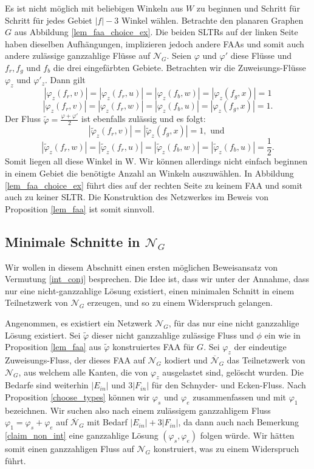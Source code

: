 \begin{example}
Es ist nicht möglich mit beliebigen Winkeln aus $W$ zu beginnen und Schritt für Schritt für jedes Gebiet $|f|-3$ Winkel wählen. Betrachte den planaren Graphen $G$ aus Abbildung \ref{lem_faa_choice_ex}. Die beiden SLTRs auf der linken Seite haben dieselben Aufhängungen, implizieren jedoch andere FAAs und somit auch andere zulässige ganzzahlige Flüsse auf $\mathcal{N}_G$. Seien $\varphi$ und $\varphi'$ diese Flüsse und $f_{r},f_{g}$ und $f_b$ die drei eingefärbten Gebiete. Betrachten wir die Zuweisungs-Flüsse $\varphi_z$ und $\varphi'_z$. Dann gilt $$|\varphi_z(f_r,v)|=|\varphi_z(f_r,u)|=|\varphi_z(f_b,w)| = |\varphi_z(f_g,x)| = 1$$
$$|\varphi_z(f_r,v)|=|\varphi_z(f_r,w)|=|\varphi_z(f_b,u)| = |\varphi_z(f_g,x)| = 1.$$
Der Fluss $\tilde{\varphi}=\frac{\varphi+\varphi'}{2}$ ist ebenfalls zulässig und es folgt:
$$|\tilde{\varphi}_z(f_r,v)|=|\tilde{\varphi}_z(f_g,x)| = 1, \text{ und } $$
$$|\tilde{\varphi}_z(f_r,w)|=|\tilde{\varphi}_z(f_r,u)| = |\tilde{\varphi}_z(f_b,w)|=|\tilde{\varphi}_z(f_b,u)| = \frac{1}{2}.$$
Somit liegen all diese Winkel in W. Wir können allerdings nicht einfach beginnen in einem Gebiet die benötigte Anzahl an Winkeln auszuwählen. In Abbildung \ref{lem_faa_choice_ex} führt dies auf der rechten Seite zu keinem FAA und somit auch zu keiner SLTR. Die Konstruktion des Netzwerkes im Beweis von Proposition \ref{lem_faa} ist somit sinnvoll.
\end{example}

\subsection{Minimale Schnitte in $\mathcal{N}_G$}

Wir wollen in diesem Abschnitt einen ersten möglichen Beweisansatz von Vermutung \ref{int_conj} besprechen. Die Idee ist, dass wir unter der Annahme, dass nur eine nicht-ganzzahlige Lösung existiert, einen minimalen Schnitt in einem Teilnetzwerk von $\mathcal{N}_G$ erzeugen, und so zu einem Widerspruch gelangen. 

Angenommen, es existiert ein Netzwerk $\mathcal{N}_G$, für das nur eine nicht ganzzahlige Lösung existiert. Sei $\tilde{\varphi}$ dieser nicht ganzzahlige zulässige Fluss und $\phi$ ein wie in Proposition \ref{lem_faa} aus $\tilde{\varphi}$ konstruiertes FAA für $G$. Sei $\varphi_z$ der eindeutige Zuweisungs-Fluss, der dieses FAA auf $\mathcal{N}_G$ kodiert und $\overline{\mathcal{N}}_G$ das Teilnetzwerk von $\mathcal{N}_G$, aus welchem alle Kanten, die von $\varphi_z$ ausgelastet sind, gelöscht wurden. Die Bedarfe sind weiterhin $|E_{in}|$ und $3|F_{in}|$ für den Schnyder- und Ecken-Fluss. Nach Proposition \ref{choose_types} können wir $\varphi_s$ und $\varphi_e$ zusammenfassen und mit $\varphi_1$ bezeichnen. Wir suchen also nach einem zulässigem ganzzahligem Fluss $\varphi_1 = \varphi_s + \varphi_e$ auf $\overline{\mathcal{N}}_G$ mit Bedarf $|E_{in}| + 3|F_{in}|$, da dann auch nach Bemerkung \ref{claim_non_int} eine ganzzahlige Lösung $(\varphi_s,\varphi_e)$ folgen würde. Wir hätten somit einen ganzzahligen Fluss auf $\mathcal{N}_G$ konstruiert, was zu einem Widerspruch führt.

